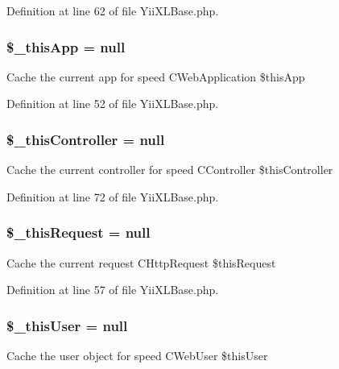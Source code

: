 Definition at line 62 of file YiiXLBase.php.

\hypertarget{classYiiXLBase_af6f88e94a08d7714446e9d14aec8eccd}{
\subsubsection[{\$\_\-thisApp}]{\setlength{\rightskip}{0pt plus 5cm}\$\_\-thisApp = null}}
\label{classYiiXLBase_af6f88e94a08d7714446e9d14aec8eccd}
Cache the current app for speed  CWebApplication \$thisApp 

Definition at line 52 of file YiiXLBase.php.

\hypertarget{classYiiXLBase_a32cb14890abc35b436e106a457c6ca97}{
\subsubsection[{\$\_\-thisController}]{\setlength{\rightskip}{0pt plus 5cm}\$\_\-thisController = null}}
\label{classYiiXLBase_a32cb14890abc35b436e106a457c6ca97}
Cache the current controller for speed  CController \$thisController 

Definition at line 72 of file YiiXLBase.php.

\hypertarget{classYiiXLBase_ab300f41b1bfad0b7fbf250eb7fb46eea}{
\subsubsection[{\$\_\-thisRequest}]{\setlength{\rightskip}{0pt plus 5cm}\$\_\-thisRequest = null}}
\label{classYiiXLBase_ab300f41b1bfad0b7fbf250eb7fb46eea}
Cache the current request  CHttpRequest \$thisRequest 

Definition at line 57 of file YiiXLBase.php.

\hypertarget{classYiiXLBase_a942de4b5bc91566b1ca1452da4166059}{
\subsubsection[{\$\_\-thisUser}]{\setlength{\rightskip}{0pt plus 5cm}\$\_\-thisUser = null}}
\label{classYiiXLBase_a942de4b5bc91566b1ca1452da4166059}
Cache the user object for speed  CWebUser \$thisUser 

